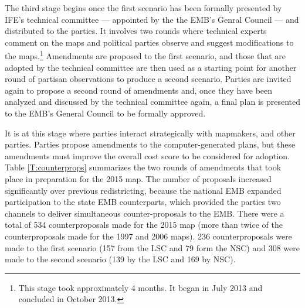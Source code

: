 \documentclass[letter,12pt]{article}
\begin{document}


The third stage begins once the first scenario has been formally presented by IFE's technical committee --- appointed by the the EMB's Genral Council --- and distributed to the parties. It involves two rounds where technical experts comment on the maps and political parties observe and suggest modifications to the maps.\footnote{This stage took approximately 4 months. It began in July 2013 and concluded in October 2013.} Amendments are proposed to the first scenario, and those that are adopted by the technical committee are then used as a starting point for another round of partisan observations to produce a second scenario. Parties are invited again to propose a second round of amendments and, once they have been analyzed and discussed by the technical committee again, a final plan is presented to the EMB's General Council to be formally approved.



It is at this stage where parties interact strategically with mapmakers, and other parties. Parties propose amendments to the computer-generated plans, but these amendments must improve the overall cost score to be considered for adoption. Table \ref{T:counterprops} summarizes the two rounds of amendments that took place in preparation for the 2015 map. The number of proposals increased significantly over previous redistricting, because the national EMB expanded participation to the state EMB counterparts, which provided the parties two channels to deliver simultaneous counter-proposals to the EMB. There were a total of 534 counterproposals made for the 2015 map (more than twice of the counterproposals made for the 1997 and 2006 maps). 236 counterproposals were made to the first scenario (157 from the LSC and 79 form the NSC) and 308 were made to the second scenario (139 by the LSC and 169 by NSC).
\end{document}
